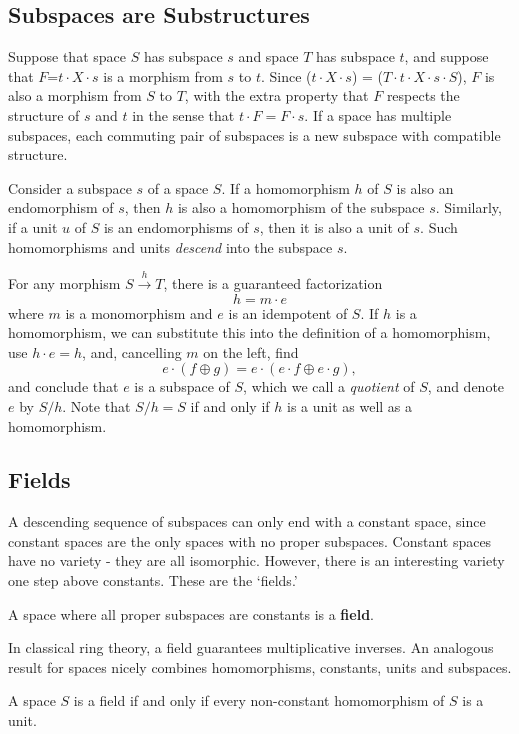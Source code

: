 \documentclass[11pt]{article}
\begin{document}
\subsection{Subspaces are Substructures} 

Suppose that space $S$ has subspace $s$ and space $T$ has subspace $t$, and suppose that $F$=$t\cdot X\cdot s$ is a morphism from $s$ to $t$.   
Since ($t\cdot X\cdot s$) = ($T\cdot t \cdot X\cdot s\cdot S$), 
$F$ is also a morphism from $S$ to $T$, with the extra property that $F$ respects the structure of $s$ and $t$ in the sense that $t\cdot F=F\cdot s$.  
If a space has multiple subspaces, each commuting pair of subspaces is a new subspace with compatible structure.  

     Consider a subspace $s$ of a space $S$.  If a homomorphism $h$ of $S$ is also an endomorphism of $s$, then $h$ is also a 
homomorphism of the subspace $s$.  Similarly, if a unit $u$ of $S$ is an endomorphisms of $s$, then it is also a unit of $s$.  Such 
homomorphisms and units {\it descend} into the subspace $s$.  

       For any morphism $S{\overset h \longrightarrow}T$, there is a guaranteed factorization  
\begin{equation}
h = m \cdot e
\end{equation}
where $m$ is a monomorphism and $e$ is an idempotent of $S$.  If $h$ is a homomorphism, we can substitute this into the 
definition of a homomorphism, use $h\cdot e=h$, and, cancelling $m$ on the left, find 
\begin{equation}
e\cdot (f\oplus g) = e\cdot (e\cdot f \oplus e\cdot g),
\end{equation}
and conclude that $e$ is a subspace of $S$, which we call a {\it quotient} of $S$, and denote $e$ by $S/h$.  Note that $S/h=S$ if and only if $h$ is a unit as well as a homomorphism. 

\subsection{Fields}

A descending sequence of subspaces can only end with a constant space, since constant spaces are the only spaces with 
no proper subspaces.  Constant spaces have no variety - they are all isomorphic. However, there is an interesting 
variety one step above constants. These are the `fields.' 
\begin{definition}
A space where all proper subspaces are constants is a {\bf field}.
\end{definition}
\noindent In classical ring theory\cite{ring}, a field guarantees multiplicative inverses.  
An analogous result for spaces nicely combines homomorphisms, constants, units and subspaces.  
\begin{theorem}
A space $S$ is a field if and only if every non-constant homomorphism of $S$ is a unit. 
\end{theorem}
\end{document}

